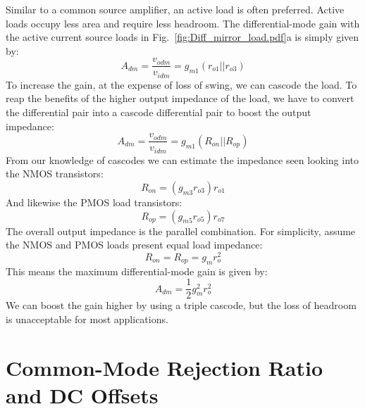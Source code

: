 Similar to a common source amplifier, an active load is often preferred.  Active loads occupy less area and require less headroom.  The differential-mode gain with the active current source loads in Fig.~\ref{fig:Diff_mirror_load.pdf}a is simply given by:
\begin{equation}
	{A_{dm}} = \frac{{{v_{odm}}}}{{{v_{idm}}}} = {g_{m1}}\left( {{r_{o1}}||{r_{o3}}} \right)
\end{equation}
To increase the gain, at the expense of loss of swing, we can cascode the load.  To reap the benefits of the higher output impedance of the load, we have to convert the differential pair into a cascode differential pair to boost the output impedance:
\begin{equation}
	{A_{dm}} = \frac{{{v_{odm}}}}{{{v_{idm}}}} = {g_{m1}}\left( {{R_{on}}||{R_{op}}} \right) 
\end{equation}
From our knowledge of cascodes we can estimate the impedance seen looking into the NMOS transistors:
\begin{equation}
	{R_{on}} = \left( {{g_{m3}}{r_{o3}}} \right){r_{o1}} 
\end{equation}
And likewise the PMOS load transistors:
\begin{equation}
	{R_{op}} = \left( {{g_{m5}}{r_{o5}}} \right){r_{o7}}
\end{equation}
The overall output impedance is the parallel combination.  For simplicity, assume the NMOS and PMOS loads present equal load impedance:
\begin{equation}
	{R_{on}} = {R_{op}} = {g_m}r_o^2
\end{equation}
This means the maximum differential-mode gain is given by:
\begin{equation}
	{A_{dm}} = \frac{1}{2}g_m^2r_o^2
\end{equation}
We can boost the gain higher by using a triple cascode, but the loss of headroom is unacceptable for most applications.
\section{Common-Mode Rejection Ratio and DC Offsets}

